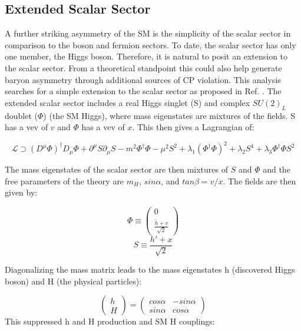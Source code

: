 \subsection{Extended Scalar Sector}
A further striking asymmetry of the SM is the simplicity of the scalar sector in comparison to the boson and fermion sectors. To date, the scalar sector has only one member, the Higgs boson. Therefore, it is natural to posit an extension to the scalar sector. From a theoretical standpoint this could also help generate baryon asymmetry through additional sources of CP violation. This analysis searches for a simple extension to the scalar sector as proposed in Ref. \cite{scalarsinglet}. The extended scalar sector includes a real Higgs singlet (S) and complex $SU(2)_{L}$ doublet ($\Phi$) (the SM Higgs), where mass eigenstates are mixtures of the fields. S has a vev of $v$ and $\Phi$ has a vev of $x$. This then gives a Lagrangian of:

\begin{equation}
\mathcal{L}\supset (D^{\mu}\Phi)^{\dag}D_{\mu}\Phi + \partial^{\mu}S\partial_{\mu}S - m^{2}\Phi^{\dag}\Phi-\mu^{2}S^{2} + \lambda_{1}(\Phi^{\dag}\Phi)^{2} + \lambda_{2}S^{4}+\lambda_{3}\Phi^{\dag}\Phi S^{2}
\end{equation}


The mass eigenstates of the scalar sector are then mixtures of $S$ and $\Phi$ and the free parameters of the theory are $m_{H}$, $sin\alpha$, and $tan\beta=v/x$. The fields are then given by:

\begin{equation}
\Phi \equiv \begin{pmatrix} 0 \\ \frac{\tilde{h}+v}{\sqrt{2}} \end{pmatrix}
\end{equation}
\begin{equation}
S \equiv \frac{h'+x}{\sqrt{2}}
\end{equation}

Diagonalizing the mass matrix leads to the mass eigenstates h (discovered Higgs boson) and H (the physical particles):

\begin{equation}
\begin{pmatrix} h \\ H \end{pmatrix} = \begin{pmatrix} cos\alpha &-sin\alpha \\ sin\alpha & cos\alpha \end{pmatrix}
\end{equation}
This suppressed h and H production and SM H couplings:

